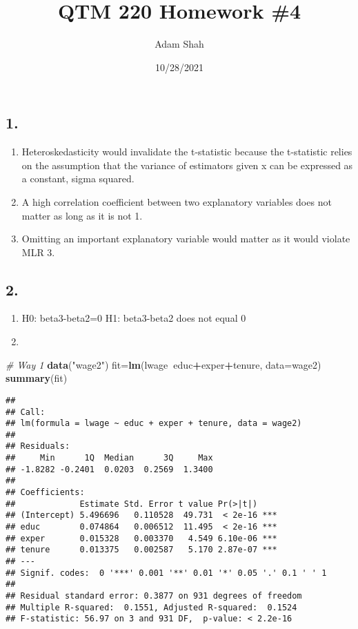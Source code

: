 \documentclass[
]{article}
\title{QTM 220 Homework \#4}
\author{Adam Shah}
\date{10/28/2021}
\newenvironment{Shaded}{\begin{snugshade}}{\end{snugshade}}
\newcommand{\CommentTok}[1]{\textcolor[rgb]{0.56,0.35,0.01}{\textit{#1}}}
\newcommand{\DataTypeTok}[1]{\textcolor[rgb]{0.13,0.29,0.53}{#1}}
\newcommand{\KeywordTok}[1]{\textcolor[rgb]{0.13,0.29,0.53}{\textbf{#1}}}
\newcommand{\NormalTok}[1]{#1}
\newcommand{\OperatorTok}[1]{\textcolor[rgb]{0.81,0.36,0.00}{\textbf{#1}}}
\newcommand{\StringTok}[1]{\textcolor[rgb]{0.31,0.60,0.02}{#1}}
\providecommand{\tightlist}{%
  \setlength{\itemsep}{0pt}\setlength{\parskip}{0pt}}
\begin{document}
\maketitle

\hypertarget{section}{%
\subsection{1.}\label{section}}

\begin{enumerate}
\def\labelenumi{\roman{enumi})}
\tightlist
\item
  Heteroskedasticity would invalidate the t-statistic because the
  t-statistic relies on the assumption that the variance of estimators
  given x can be expressed as a constant, sigma squared.
\item
  A high correlation coefficient between two explanatory variables does
  not matter as long as it is not 1.
\item
  Omitting an important explanatory variable would matter as it would
  violate MLR 3.
\end{enumerate}

\hypertarget{section-1}{%
\subsection{2.}\label{section-1}}

\begin{enumerate}
\def\labelenumi{\roman{enumi})}
\item
  H0: beta3-beta2=0 H1: beta3-beta2 does not equal 0
\item
\end{enumerate}

\begin{Shaded}
\begin{Highlighting}[]
\CommentTok{# Way 1}
\KeywordTok{data}\NormalTok{(}\StringTok{"wage2"}\NormalTok{)}
\NormalTok{fit=}\KeywordTok{lm}\NormalTok{(lwage}\OperatorTok{~}\NormalTok{educ}\OperatorTok{+}\NormalTok{exper}\OperatorTok{+}\NormalTok{tenure, }\DataTypeTok{data=}\NormalTok{wage2)}
\KeywordTok{summary}\NormalTok{(fit)}
\end{Highlighting}
\end{Shaded}

\begin{verbatim}
## 
## Call:
## lm(formula = lwage ~ educ + exper + tenure, data = wage2)
## 
## Residuals:
##     Min      1Q  Median      3Q     Max 
## -1.8282 -0.2401  0.0203  0.2569  1.3400 
## 
## Coefficients:
##             Estimate Std. Error t value Pr(>|t|)    
## (Intercept) 5.496696   0.110528  49.731  < 2e-16 ***
## educ        0.074864   0.006512  11.495  < 2e-16 ***
## exper       0.015328   0.003370   4.549 6.10e-06 ***
## tenure      0.013375   0.002587   5.170 2.87e-07 ***
## ---
## Signif. codes:  0 '***' 0.001 '**' 0.01 '*' 0.05 '.' 0.1 ' ' 1
## 
## Residual standard error: 0.3877 on 931 degrees of freedom
## Multiple R-squared:  0.1551, Adjusted R-squared:  0.1524 
## F-statistic: 56.97 on 3 and 931 DF,  p-value: < 2.2e-16
\end{verbatim}
\end{document}
